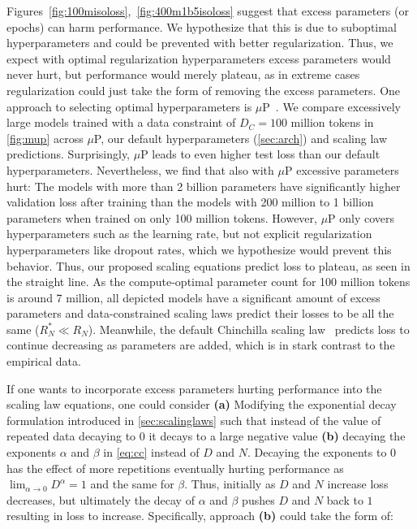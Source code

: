\documentclass{article}
\begin{document}
Figures~\ref{fig:100misoloss},~\ref{fig:400m1b5isoloss} suggest that excess parameters (or epochs) can harm performance. We hypothesize that this is due to suboptimal hyperparameters and could be prevented with better regularization. Thus, we expect with optimal regularization hyperparameters excess parameters would never hurt, but performance would merely plateau, as in extreme cases regularization could just take the form of removing the excess parameters. One approach to selecting optimal hyperparameters is $\mu$P~\cite{yang2021tuning}. We compare excessively large models trained with a data constraint of $D_C=100$ million tokens in \autoref{fig:mup} across $\mu$P, our default hyperparameters (\autoref{sec:arch}) and scaling law predictions. Surprisingly, $\mu$P leads to even higher test loss than our default hyperparameters. Nevertheless, we find that also with $\mu$P excessive parameters hurt: The models with more than 2 billion parameters have significantly higher validation loss after training than the models with 200 million to 1 billion parameters when trained on only 100 million tokens. However, $\mu$P only covers hyperparameters such as the learning rate, but not explicit regularization hyperparameters like dropout rates, which we hypothesize would prevent this behavior. Thus, our proposed scaling equations predict loss to plateau, as seen in the straight line. As the compute-optimal parameter count for 100 million tokens is around 7 million, all depicted models have a significant amount of excess parameters and data-constrained scaling laws predict their losses to be all the same ($R_N^* \ll R_N$). Meanwhile, the default Chinchilla scaling law~\cite{hoffmann2022training} predicts loss to continue decreasing as parameters are added, which is in stark contrast to the empirical data.

If one wants to incorporate excess parameters hurting performance into the scaling law equations, one could consider \textbf{(a)} Modifying the exponential decay formulation introduced in \autoref{sec:scalinglaws} such that instead of the value of repeated data decaying to $0$ it decays to a large negative value \textbf{(b)} decaying the exponents $\alpha$ and $\beta$ in \autoref{eq:cc} instead of $D$ and $N$. Decaying the exponents to $0$ has the effect of more repetitions eventually hurting performance as $\lim_{\alpha\to0}D^{\alpha} = 1$ and the same for $\beta$. Thus, initially as $D$ and $N$ increase loss decreases, but ultimately the decay of $\alpha$ and $\beta$ pushes $D$ and $N$ back to $1$ resulting in loss to increase. Specifically, approach \textbf{(b)} could take the form of:
\end{document}
